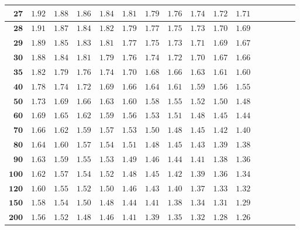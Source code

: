 \begin{alternateColorTable}
\begin{longtable}{|r|r|r|r|r|r|r|r|r|r|r|r|r|r|r|r|}
    \(\mathbf{27}\)& \(1.92\) & \(1.88\) & \(1.86\) & \(1.84\) & \(1.81\) & \(1.79\) & \(1.76\) & \(1.74\) & \(1.72\) & \(1.71\) \\ \hline 
    \(\mathbf{28}\)& \(1.91\) & \(1.87\) & \(1.84\) & \(1.82\) & \(1.79\) & \(1.77\) & \(1.75\) & \(1.73\) & \(1.70\) & \(1.69\) \\ \hline 
    \(\mathbf{29}\)& \(1.89\) & \(1.85\) & \(1.83\) & \(1.81\) & \(1.77\) & \(1.75\) & \(1.73\) & \(1.71\) & \(1.69\) & \(1.67\) \\ \hline 
    \(\mathbf{30}\)& \(1.88\) & \(1.84\) & \(1.81\) & \(1.79\) & \(1.76\) & \(1.74\) & \(1.72\) & \(1.70\) & \(1.67\) & \(1.66\) \\ \hline 
    \(\mathbf{35}\)& \(1.82\) & \(1.79\) & \(1.76\) & \(1.74\) & \(1.70\) & \(1.68\) & \(1.66\) & \(1.63\) & \(1.61\) & \(1.60\) \\ \hline 
    \(\mathbf{40}\)& \(1.78\) & \(1.74\) & \(1.72\) & \(1.69\) & \(1.66\) & \(1.64\) & \(1.61\) & \(1.59\) & \(1.56\) & \(1.55\) \\ \hline 
    \(\mathbf{50}\)& \(1.73\) & \(1.69\) & \(1.66\) & \(1.63\) & \(1.60\) & \(1.58\) & \(1.55\) & \(1.52\) & \(1.50\) & \(1.48\) \\ \hline 
    \(\mathbf{60}\)& \(1.69\) & \(1.65\) & \(1.62\) & \(1.59\) & \(1.56\) & \(1.53\) & \(1.51\) & \(1.48\) & \(1.45\) & \(1.44\) \\ \hline 
    \(\mathbf{70}\)& \(1.66\) & \(1.62\) & \(1.59\) & \(1.57\) & \(1.53\) & \(1.50\) & \(1.48\) & \(1.45\) & \(1.42\) & \(1.40\) \\ \hline 
    \(\mathbf{80}\)& \(1.64\) & \(1.60\) & \(1.57\) & \(1.54\) & \(1.51\) & \(1.48\) & \(1.45\) & \(1.43\) & \(1.39\) & \(1.38\) \\ \hline 
    \(\mathbf{90}\)& \(1.63\) & \(1.59\) & \(1.55\) & \(1.53\) & \(1.49\) & \(1.46\) & \(1.44\) & \(1.41\) & \(1.38\) & \(1.36\) \\ \hline 
    \(\mathbf{100}\)& \(1.62\) & \(1.57\) & \(1.54\) & \(1.52\) & \(1.48\) & \(1.45\) & \(1.42\) & \(1.39\) & \(1.36\) & \(1.34\) \\ \hline 
    \(\mathbf{120}\)& \(1.60\) & \(1.55\) & \(1.52\) & \(1.50\) & \(1.46\) & \(1.43\) & \(1.40\) & \(1.37\) & \(1.33\) & \(1.32\) \\ \hline 
    \(\mathbf{150}\)& \(1.58\) & \(1.54\) & \(1.50\) & \(1.48\) & \(1.44\) & \(1.41\) & \(1.38\) & \(1.34\) & \(1.31\) & \(1.29\) \\ \hline 
    \(\mathbf{200}\)& \(1.56\) & \(1.52\) & \(1.48\) & \(1.46\) & \(1.41\) & \(1.39\) & \(1.35\) & \(1.32\) & \(1.28\) & \(1.26\) \\ \hline 

\end{longtable}
\end{alternateColorTable}
